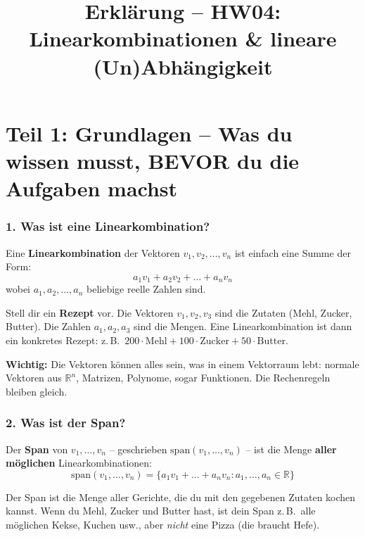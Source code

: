 \documentclass[a4paper,12pt]{article}
\title{Erkl\"arung -- HW04: Linearkombinationen \& lineare (Un)Abh\"angigkeit}
\author{}
\date{}
\begin{document}
\maketitle

\part*{Teil 1: Grundlagen -- Was du wissen musst, BEVOR du die Aufgaben machst}

\section*{1. Was ist eine Linearkombination?}

Eine \textbf{Linearkombination} der Vektoren $v_1, v_2, \ldots, v_n$ ist einfach eine Summe der Form:
\[
a_1 v_1 + a_2 v_2 + \ldots + a_n v_n
\]
wobei $a_1, a_2, \ldots, a_n$ beliebige reelle Zahlen sind.

\begin{analogie}
Stell dir ein \textbf{Rezept} vor. Die Vektoren $v_1, v_2, v_3$ sind die Zutaten (Mehl, Zucker, Butter). Die Zahlen $a_1, a_2, a_3$ sind die Mengen. Eine Linearkombination ist dann ein konkretes Rezept: z.\,B.\ $200 \cdot \text{Mehl} + 100 \cdot \text{Zucker} + 50 \cdot \text{Butter}$.
\end{analogie}

\textbf{Wichtig:} Die Vektoren k\"onnen alles sein, was in einem Vektorraum lebt: normale Vektoren aus $\mathbb{R}^n$, Matrizen, Polynome, sogar Funktionen. Die Rechenregeln bleiben gleich.

\section*{2. Was ist der Span?}

Der \textbf{Span} von $v_1, \ldots, v_n$ -- geschrieben $\text{span}(v_1, \ldots, v_n)$ -- ist die Menge \textbf{aller m\"oglichen} Linearkombinationen:
\[
\text{span}(v_1, \ldots, v_n) = \{a_1 v_1 + \ldots + a_n v_n : a_1, \ldots, a_n \in \mathbb{R}\}
\]

\begin{analogie}
Der Span ist die Menge aller Gerichte, die du mit den gegebenen Zutaten kochen kannst. Wenn du Mehl, Zucker und Butter hast, ist dein Span z.\,B.\ alle m\"oglichen Kekse, Kuchen usw., aber \emph{nicht} eine Pizza (die braucht Hefe).
\end{analogie}
\end{document}
